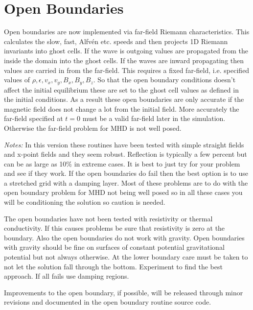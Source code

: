 \documentclass[11pt]{article}
\begin{document}

\section{Open  Boundaries} %
\label{sec:open_bcs}
Open boundaries are now implemented via far-field Riemann characteristics. This calculates the slow, fast, Alfv\'en etc. 
speeds and then projects 1D Riemann invariants into ghost cells. If the wave is outgoing values are propagated from 
the inside the domain into the ghost cells. If the waves are inward propagating then values are carried in from the 
far-field. This requires a fixed far-field, i.e. specified values of $\rho, \epsilon, v_x, v_y, B_x, B_y, B_z$. So 
that the open boundary conditions doesn't affect the initial equilibrium these are set to the ghost cell values as 
defined in the initial conditions. As a result these open boundaries are only accurate if the magnetic field does 
not change a lot from the initial field. More accurately the far-field specified at $t=0$ must be a valid far-field 
later in the simulation. Otherwise the far-field problem for MHD is not well posed.

{\it Notes:} In this version these routines have been tested with simple straight fields and x-point fields and they 
seem robust. Reflection is typically a few percent but can be as large as 10\% in extreme cases. It is best to just 
try for your problem and see if they work. If the open boundaries do fail then the best option is to use a stretched 
grid with a damping layer. Most of these problems are to do with the open boundary problem for MHD not being well 
posed so in all these cases you will be conditioning the solution so caution is needed.

The open boundaries have not been tested with resistivity or thermal conductivity. If this causes problems 
be sure that resistivity is zero at the boundary. Also the open boundaries do not work with gravity. 
Open boundaries with gravity should be fine on surfaces of constant potential gravitational potential 
but not always otherwise. At the lower boundary care must be taken to not let the solution fall through 
the bottom. Experiment to find the best approach. If all fails use damping regions.

Improvements to the open boundary, if possible, will be released through minor revisions and documented 
in the open boundary routine source code.

\end{document}

